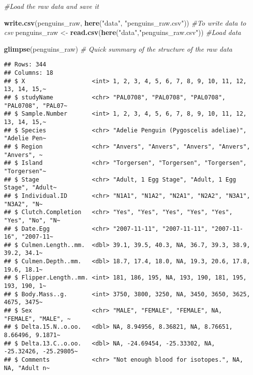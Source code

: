 \documentclass[
]{article}
\newenvironment{Shaded}{\begin{snugshade}}{\end{snugshade}}
\newcommand{\CommentTok}[1]{\textcolor[rgb]{0.56,0.35,0.01}{\textit{#1}}}
\newcommand{\FunctionTok}[1]{\textcolor[rgb]{0.13,0.29,0.53}{\textbf{#1}}}
\newcommand{\NormalTok}[1]{#1}
\newcommand{\OtherTok}[1]{\textcolor[rgb]{0.56,0.35,0.01}{#1}}
\newcommand{\StringTok}[1]{\textcolor[rgb]{0.31,0.60,0.02}{#1}}
\begin{document}
\begin{Shaded}
\begin{Highlighting}[]
\CommentTok{\#Load the raw data and save it}

\FunctionTok{write.csv}\NormalTok{(penguins\_raw, }\FunctionTok{here}\NormalTok{(}\StringTok{"data"}\NormalTok{, }\StringTok{"penguins\_raw.csv"}\NormalTok{)) }\CommentTok{\#To write data to csv}
\NormalTok{penguins\_raw }\OtherTok{\textless{}{-}} \FunctionTok{read.csv}\NormalTok{(}\FunctionTok{here}\NormalTok{(}\StringTok{"data"}\NormalTok{,}\StringTok{"penguins\_raw.csv"}\NormalTok{)) }\CommentTok{\#Load data }

\FunctionTok{glimpse}\NormalTok{(penguins\_raw) }\CommentTok{\# Quick summary of the structure of the raw data}
\end{Highlighting}
\end{Shaded}

\begin{verbatim}
## Rows: 344
## Columns: 18
## $ X                   <int> 1, 2, 3, 4, 5, 6, 7, 8, 9, 10, 11, 12, 13, 14, 15,~
## $ studyName           <chr> "PAL0708", "PAL0708", "PAL0708", "PAL0708", "PAL07~
## $ Sample.Number       <int> 1, 2, 3, 4, 5, 6, 7, 8, 9, 10, 11, 12, 13, 14, 15,~
## $ Species             <chr> "Adelie Penguin (Pygoscelis adeliae)", "Adelie Pen~
## $ Region              <chr> "Anvers", "Anvers", "Anvers", "Anvers", "Anvers", ~
## $ Island              <chr> "Torgersen", "Torgersen", "Torgersen", "Torgersen"~
## $ Stage               <chr> "Adult, 1 Egg Stage", "Adult, 1 Egg Stage", "Adult~
## $ Individual.ID       <chr> "N1A1", "N1A2", "N2A1", "N2A2", "N3A1", "N3A2", "N~
## $ Clutch.Completion   <chr> "Yes", "Yes", "Yes", "Yes", "Yes", "Yes", "No", "N~
## $ Date.Egg            <chr> "2007-11-11", "2007-11-11", "2007-11-16", "2007-11~
## $ Culmen.Length..mm.  <dbl> 39.1, 39.5, 40.3, NA, 36.7, 39.3, 38.9, 39.2, 34.1~
## $ Culmen.Depth..mm.   <dbl> 18.7, 17.4, 18.0, NA, 19.3, 20.6, 17.8, 19.6, 18.1~
## $ Flipper.Length..mm. <int> 181, 186, 195, NA, 193, 190, 181, 195, 193, 190, 1~
## $ Body.Mass..g.       <int> 3750, 3800, 3250, NA, 3450, 3650, 3625, 4675, 3475~
## $ Sex                 <chr> "MALE", "FEMALE", "FEMALE", NA, "FEMALE", "MALE", ~
## $ Delta.15.N..o.oo.   <dbl> NA, 8.94956, 8.36821, NA, 8.76651, 8.66496, 9.1871~
## $ Delta.13.C..o.oo.   <dbl> NA, -24.69454, -25.33302, NA, -25.32426, -25.29805~
## $ Comments            <chr> "Not enough blood for isotopes.", NA, NA, "Adult n~
\end{verbatim}
\end{document}
